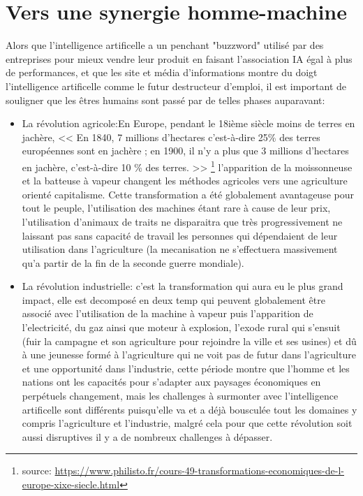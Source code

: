 \part{Vers une synergie homme-machine}
    Alors que l'intelligence artificelle a un penchant "buzzword" utilisé par des entreprises pour 
    mieux vendre leur produit en faisant l'association IA égal à plus de performances, et que les 
    site et média d'informations montre du doigt l'intelligence artificelle comme le futur destructeur 
    d'emploi, il est important de souligner que les êtres humains sont passé par de telles phases 
    auparavant: \newline 

    \begin{itemize}
        \item La révolution agricole:En Europe, pendant le 18ième siècle moins de terres en jachère,
        << En 1840, 7 millions d'hectares c'est-à-dire 25\% 
        des terres européennes sont en jachère ; en 1900, il n'y a plus que 3
         millions d'hectares en jachère, c'est-à-dire 10 \% des terres. >>
         \footnote{source: \url{https://www.philisto.fr/cours-49-transformations-economiques-de-l-europe-xixe-siecle.html}}
         l'apparition de la moissonneuse et la batteuse à vapeur changent les méthodes agricoles 
         vers une agriculture orienté capitalisme. 
         Cette transformation a été globalement avantageuse pour tout le peuple, l'utilisation 
         des machines étant rare à cause de leur prix, l'utilisation d'animaux de traits ne 
         disparaitra que très progressivement ne laissant pas sans capacité de travail les personnes
         qui dépendaient de leur utilisation dans l'agriculture (la mecanisation ne s'effectuera 
         massivement qu'a partir de la fin de la seconde guerre mondiale). \newline 

         \item La révolution industrielle: c'est la transformation qui aura eu le plus grand impact,
         elle est decomposé en deux temp qui peuvent globalement être associé avec 
         l'utilisation de la machine à vapeur puis l'apparition de l'electricité, du gaz ainsi que 
         moteur à explosion, l'exode rural qui s'ensuit (fuir la campagne et son agriculture pour 
         rejoindre la ville et ses usines) et dû à une jeunesse formé à l'agriculture 
         qui ne voit pas de futur dans l'agriculture et une opportunité dans l'industrie,
         cette période montre que l'homme et les nations ont les capacités pour s'adapter 
         aux paysages économiques en perpétuels changement, mais les challenges à surmonter 
         avec l'intelligence artificelle sont différents puisqu'elle va et a déjà bousculée tout 
         les domaines y compris l'agriculture et l'industrie, malgré cela pour que cette 
         révolution soit aussi disruptives il y a de nombreux challenges à dépasser.
    \end{itemize}


